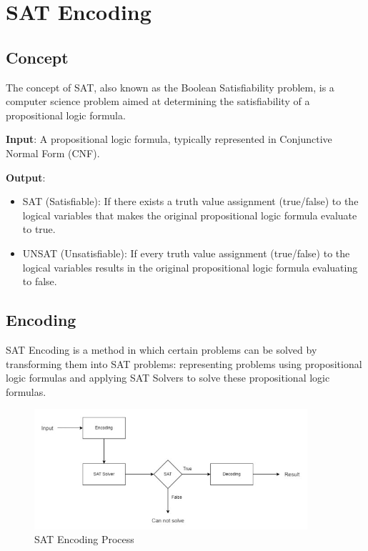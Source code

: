 \section{SAT Encoding}
\subsection{Concept}
The concept of SAT, also known as the Boolean Satisfiability problem,
is a computer science problem aimed at determining the satisfiability of a propositional logic formula.

\begin{flushleft}
    \textbf{Input}: A propositional logic formula, typically represented in Conjunctive Normal Form\cite{cnf} (CNF).
\end{flushleft}

\begin{flushleft}
    \textbf{Output}:
\end{flushleft}
\begin{itemize}
    \item SAT (Satisfiable): If there exists a truth value assignment (true/false) to the
          logical variables that makes the original propositional logic formula evaluate to true.
    \item UNSAT (Unsatisfiable): If every truth value assignment (true/false) to the
          logical variables results in the original propositional logic formula evaluating to false.
\end{itemize}

\subsection{Encoding}
SAT Encoding is a method in which certain problems can be solved by transforming
them into SAT problems: representing problems using propositional logic formulas and
applying SAT Solvers to solve these propositional logic formulas\cite{pham_ngoc_anh}.

\begin{figure}
    \centering
    \includegraphics[width=0.9\textwidth]{chapter1/image/flow_sat.jpg}
    \caption{SAT Encoding Process}
    \label{fig:sat_encoding_process}
\end{figure}

